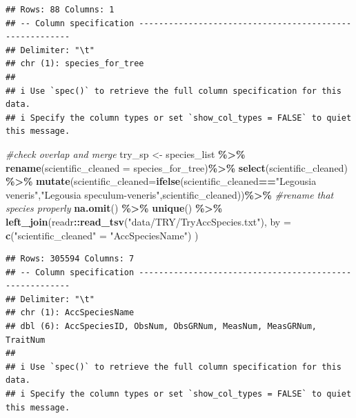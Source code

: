 \documentclass[
  12pt,
  american,
  a4paper,
  extrafontsizes,onecolumn,openright
  ]{memoir}
\newenvironment{Shaded}{\begin{snugshade}}{\end{snugshade}}
\newcommand{\AttributeTok}[1]{\textcolor[rgb]{0.13,0.29,0.53}{#1}}
\newcommand{\CommentTok}[1]{\textcolor[rgb]{0.56,0.35,0.01}{\textit{#1}}}
\newcommand{\FunctionTok}[1]{\textcolor[rgb]{0.13,0.29,0.53}{\textbf{#1}}}
\newcommand{\NormalTok}[1]{#1}
\newcommand{\OtherTok}[1]{\textcolor[rgb]{0.56,0.35,0.01}{#1}}
\newcommand{\SpecialCharTok}[1]{\textcolor[rgb]{0.81,0.36,0.00}{\textbf{#1}}}
\newcommand{\StringTok}[1]{\textcolor[rgb]{0.31,0.60,0.02}{#1}}
\begin{document}
\begin{verbatim}
## Rows: 88 Columns: 1
## -- Column specification --------------------------------------------------------
## Delimiter: "\t"
## chr (1): species_for_tree
## 
## i Use `spec()` to retrieve the full column specification for this data.
## i Specify the column types or set `show_col_types = FALSE` to quiet this message.
\end{verbatim}

\begin{Shaded}
\begin{Highlighting}[]
\CommentTok{\#check overlap and merge}
\NormalTok{try\_sp }\OtherTok{\textless{}{-}}\NormalTok{ species\_list }\SpecialCharTok{\%\textgreater{}\%}
  \FunctionTok{rename}\NormalTok{(}\AttributeTok{scientific\_cleaned =}\NormalTok{ species\_for\_tree)}\SpecialCharTok{\%\textgreater{}\%}
  \FunctionTok{select}\NormalTok{(scientific\_cleaned) }\SpecialCharTok{\%\textgreater{}\%}
  \FunctionTok{mutate}\NormalTok{(}\AttributeTok{scientific\_cleaned=}\FunctionTok{ifelse}\NormalTok{(scientific\_cleaned}\SpecialCharTok{==}\StringTok{"Legousia veneris"}\NormalTok{,}\StringTok{"Legousia speculum{-}veneris"}\NormalTok{,scientific\_cleaned))}\SpecialCharTok{\%\textgreater{}\%} \CommentTok{\#rename that species properly}
  \FunctionTok{na.omit}\NormalTok{() }\SpecialCharTok{\%\textgreater{}\%}
  \FunctionTok{unique}\NormalTok{() }\SpecialCharTok{\%\textgreater{}\%}
  \FunctionTok{left\_join}\NormalTok{(readr}\SpecialCharTok{::}\FunctionTok{read\_tsv}\NormalTok{(}\StringTok{"data/TRY/TryAccSpecies.txt"}\NormalTok{),}
            \AttributeTok{by =} \FunctionTok{c}\NormalTok{(}\StringTok{"scientific\_cleaned"} \OtherTok{=} \StringTok{"AccSpeciesName"}\NormalTok{)}
\NormalTok{  )}
\end{Highlighting}
\end{Shaded}

\begin{verbatim}
## Rows: 305594 Columns: 7
## -- Column specification --------------------------------------------------------
## Delimiter: "\t"
## chr (1): AccSpeciesName
## dbl (6): AccSpeciesID, ObsNum, ObsGRNum, MeasNum, MeasGRNum, TraitNum
## 
## i Use `spec()` to retrieve the full column specification for this data.
## i Specify the column types or set `show_col_types = FALSE` to quiet this message.
\end{verbatim}
\end{document}
